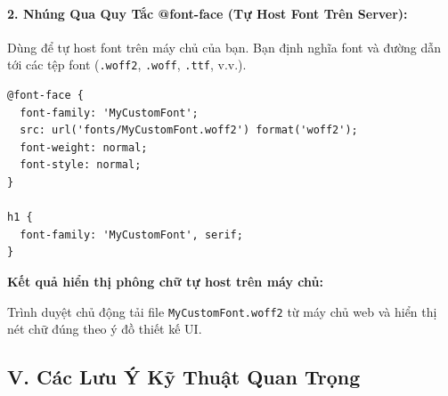 \documentclass[11pt,oneside]{book}
\newcommand{\codeinline}[1]{\textcolor{accentOrange}{\texttt{#1}}}
\begin{document}
\paragraph{2. Nhúng Qua Quy Tắc @font-face (Tự Host Font Trên Server):}
Dùng để tự host font trên máy chủ của bạn. Bạn định nghĩa font và đường dẫn tới các tệp font (\codeinline{.woff2}, \codeinline{.woff}, \codeinline{.ttf}, v.v.).

\begin{codeWindow}
\begin{lstlisting}[language=CSS3]
@font-face {
  font-family: 'MyCustomFont';
  src: url('fonts/MyCustomFont.woff2') format('woff2');
  font-weight: normal;
  font-style: normal;
}

h1 {
  font-family: 'MyCustomFont', serif;
}
\end{lstlisting}
\end{codeWindow}

\begin{browserWindow}
\begin{tcolorbox}[arc=4pt, colback=white, colframe=primaryBlue!30, boxrule=0.8pt, top=10pt, bottom=10pt, left=12pt, right=12pt]
  {\sffamily\bfseries\color{primaryBlue} Kết quả hiển thị phông chữ tự host trên máy chủ:}\par\vspace{4pt}
  {\sffamily Trình duyệt chủ động tải file \codeinline{MyCustomFont.woff2} từ máy chủ web và hiển thị nét chữ đúng theo ý đồ thiết kế UI.}
\end{tcolorbox}
\end{browserWindow}

\subsection*{V. Các Lưu Ý Kỹ Thuật Quan Trọng}
\end{document}
